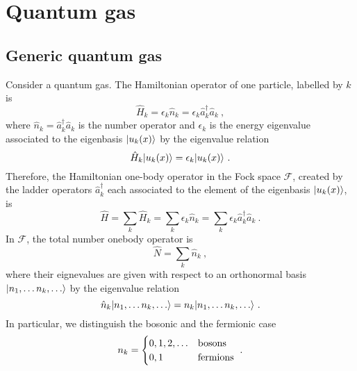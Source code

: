 \chapter{Quantum gas}

\section{Generic quantum gas}

    Consider a quantum gas. The Hamiltonian operator of one particle, labelled by $k$ is 
    \begin{equation*}
        \hat H_k = \epsilon_k \hat n_k = \epsilon_k \hat a^\dagger_k \hat a_k ~,
    \end{equation*}
    where $\hat n_k = \hat a^\dagger_k \hat a_k$ is the number operator and $\epsilon_k$ is the energy eigenvalue associated to the eigenbasis $\vert u_k(x)\rangle$ by the eigenvalue relation
    \begin{equation*}
        \hat H_k \vert u_k(x)\rangle = \epsilon_k \vert u_k(x)\rangle ~.
    \end{equation*} 
    Therefore, the Hamiltonian one-body operator in the Fock space $\mathcal F$, created by the ladder operators $\hat a^\dagger_k$ each associated to the element of the eigenbasis $\vert u_k(x)\rangle$, is 
    \begin{equation*}
        \hat H = \sum_k \hat H_k =  \sum_k \epsilon_k \hat n_k =  \sum_k \epsilon_k \hat a^\dagger_k \hat a_k ~.
    \end{equation*}
    In $\mathcal F$, the total number onebody operator is 
    \begin{equation*}
        \hat N = \sum_k \hat n_k ~,
    \end{equation*}
    where their eignevalues are given with respect to an orthonormal basis $\vert n_1, \ldots n_k, \ldots\rangle$ by the eigenvalue relation
    \begin{equation*}
        \hat n_k \vert n_1, \ldots n_k, \ldots\rangle = n_k \vert n_1, \ldots n_k, \ldots\rangle ~.
    \end{equation*}
    In particular, we distinguish the bosonic and the fermionic case
    \begin{equation*}
        n_k = \begin{cases}
            0,1,2,\ldots & \textnormal{bosons} \\
            0,1 & \textnormal{fermions} \\
        \end{cases} ~.
    \end{equation*}

